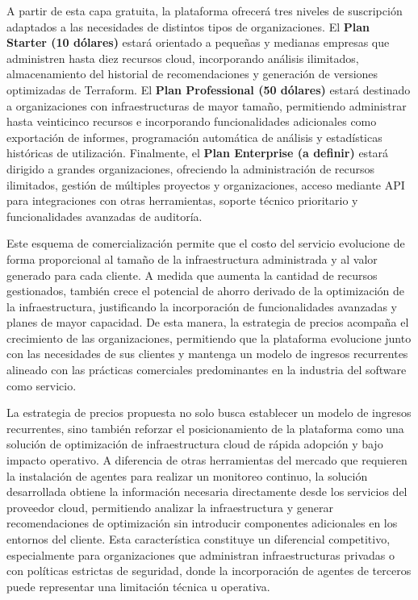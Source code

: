 A partir de esta capa gratuita, la plataforma ofrecerá tres niveles de suscripción adaptados a las necesidades de distintos tipos de organizaciones. El \textbf{Plan Starter (10 dólares)} estará orientado a pequeñas y medianas empresas que administren hasta diez recursos cloud, incorporando análisis ilimitados, almacenamiento del historial de recomendaciones y generación de versiones optimizadas de Terraform. El \textbf{Plan Professional (50 dólares)} estará destinado a organizaciones con infraestructuras de mayor tamaño, permitiendo administrar hasta veinticinco recursos e incorporando funcionalidades adicionales como exportación de informes, programación automática de análisis y estadísticas históricas de utilización. Finalmente, el \textbf{Plan Enterprise (a definir)} estará dirigido a grandes organizaciones, ofreciendo la administración de recursos ilimitados, gestión de múltiples proyectos y organizaciones, acceso mediante API para integraciones con otras herramientas, soporte técnico prioritario y funcionalidades avanzadas de auditoría.

Este esquema de comercialización permite que el costo del servicio evolucione de forma proporcional al tamaño de la infraestructura administrada y al valor generado para cada cliente. A medida que aumenta la cantidad de recursos gestionados, también crece el potencial de ahorro derivado de la optimización de la infraestructura, justificando la incorporación de funcionalidades avanzadas y planes de mayor capacidad. De esta manera, la estrategia de precios acompaña el crecimiento de las organizaciones, permitiendo que la plataforma evolucione junto con las necesidades de sus clientes y mantenga un modelo de ingresos recurrentes alineado con las prácticas comerciales predominantes en la industria del software como servicio.

La estrategia de precios propuesta no solo busca establecer un modelo de ingresos recurrentes, sino también reforzar el posicionamiento de la plataforma como una solución de optimización de infraestructura cloud de rápida adopción y bajo impacto operativo. A diferencia de otras herramientas del mercado que requieren la instalación de agentes para realizar un monitoreo continuo, la solución desarrollada obtiene la información necesaria directamente desde los servicios del proveedor cloud, permitiendo analizar la infraestructura y generar recomendaciones de optimización sin introducir componentes adicionales en los entornos del cliente. Esta característica constituye un diferencial competitivo, especialmente para organizaciones que administran infraestructuras privadas o con políticas estrictas de seguridad, donde la incorporación de agentes de terceros puede representar una limitación técnica u operativa.

